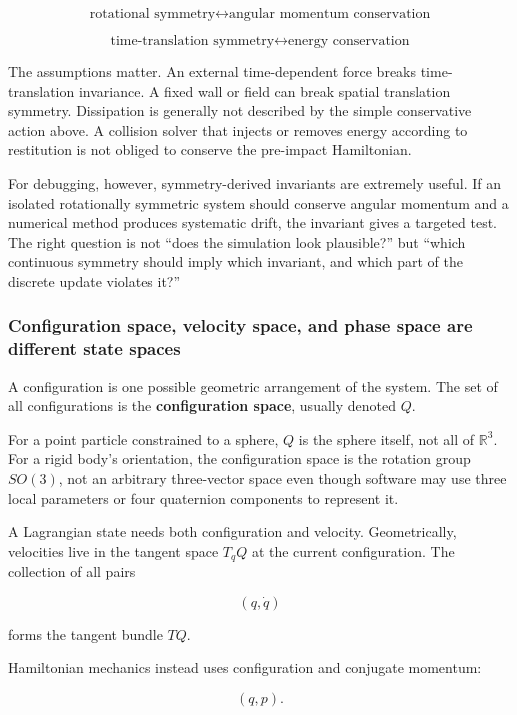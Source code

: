 \[
\boxed{
\text{rotational symmetry}
\longleftrightarrow
\text{angular momentum conservation}
}
\]

\[
\boxed{
\text{time-translation symmetry}
\longleftrightarrow
\text{energy conservation}
}
\]

The assumptions matter. An external time-dependent force breaks time-translation invariance. A fixed wall or field can break spatial translation symmetry. Dissipation is generally not described by the simple conservative action above. A collision solver that injects or removes energy according to restitution is not obliged to conserve the pre-impact Hamiltonian.

For debugging, however, symmetry-derived invariants are extremely useful. If an isolated rotationally symmetric system should conserve angular momentum and a numerical method produces systematic drift, the invariant gives a targeted test. The right question is not ``does the simulation look plausible?'' but ``which continuous symmetry should imply which invariant, and which part of the discrete update violates it?''

\subsubsection{Configuration space, velocity space, and phase space are different state spaces}\label{02-foundations-ii-ch025-configuration-space-velocity-space-and-phase-space-are-different-state-spaces}

A configuration is one possible geometric arrangement of the system. The set of all configurations is the \textbf{configuration space}, usually denoted \(Q\).

For a point particle constrained to a sphere, \(Q\) is the sphere itself, not all of \(\mathbb R^3\). For a rigid body's orientation, the configuration space is the rotation group \(SO(3)\), not an arbitrary three-vector space even though software may use three local parameters or four quaternion components to represent it.

A Lagrangian state needs both configuration and velocity. Geometrically, velocities live in the tangent space \(T_qQ\) at the current configuration. The collection of all pairs

\[
(q,\dot q)
\]

forms the tangent bundle \(TQ\).

Hamiltonian mechanics instead uses configuration and conjugate momentum:

\[
(q,p).
\]

